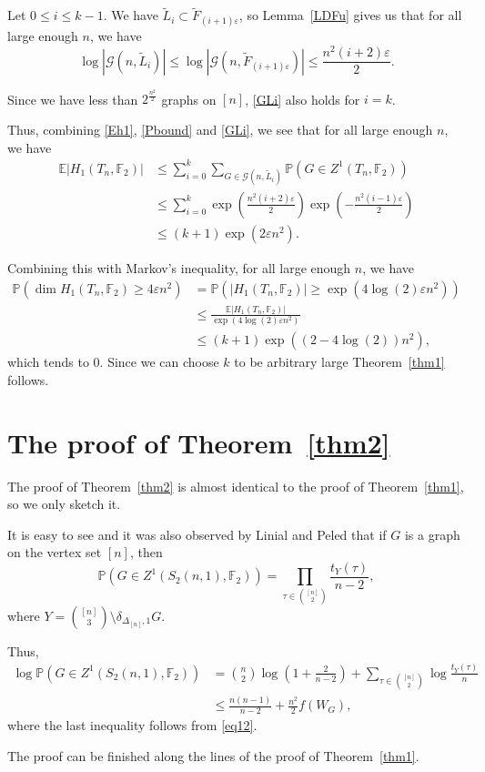 \documentclass[11pt,a4paper]{article}
\theoremstyle{plain}
\theoremstyle{definition}
\begin{document}
Let $0\le i\le k-1$. We have $\widetilde{L}_i\subset \widetilde{F}_{(i+1)\varepsilon}$, so Lemma~\ref{LDFu} gives us that for all large enough $n$, we have
\begin{equation}\label{GLi}\log |\mathcal{G}(n,\widetilde{L}_i)|\le \log |\mathcal{G}(n,\widetilde{F}_{(i+1)\varepsilon})|\le \frac{n^2(i+2)\varepsilon}2.
\end{equation}

Since we have less than $2^{\frac{n^2}2}$ graphs on $[n]$, \eqref{GLi} also holds for $i=k$. 

Thus, combining \eqref{Eh1}, \eqref{Pbound} and \eqref{GLi}, we see that for all large enough $n$, we have
\begin{align*}\mathbb{E} |H_1(T_n,\mathbb{F}_2)|&\le\sum_{i=0}^k \sum_{G\in \mathcal{G}(n,\widetilde{L}_i)}\mathbb{P}\left(G\in Z^1(T_n,\mathbb{F}_2)\right)\\&\le \sum_{i=0}^k \exp\left(\frac{n^2(i+2)\varepsilon}2\right)\exp\left(-\frac{n^2(i-1)\varepsilon}2\right)\\&\le (k+1)\exp\left(2\varepsilon n^2 \right).
\end{align*}

Combining this with Markov's inequality, for all large enough $n$, we have
\begin{align*}\mathbb{P}(\dim H_1(T_n,\mathbb{F}_2)\ge 4\varepsilon n^2)&=\mathbb{P}(| H_1(T_n,\mathbb{F}_2)|\ge \exp(4\log(2)\varepsilon n^2))\\&\le \frac{\mathbb{E} |H_1(T_n,\mathbb{F}_2)|}{\exp(4\log(2)\varepsilon n^2)}\\&\le (k+1)\exp((2-4\log(2))n^2), \end{align*}
which tends to $0$. Since we can choose $k$ to be arbitrary large Theorem~\ref{thm1} follows.

\section{The proof of Theorem~\ref{thm2}}

The proof of Theorem~\ref{thm2} is almost identical to the proof of Theorem~\ref{thm1}, so we only sketch it.

It is easy to see and it was also observed by Linial and Peled \cite[Section 5]{linial2019enumeration} that if $G$ is a graph on the vertex set $[n]$, then
\[\mathbb{P}\left(G\in Z^1(S_2(n,1),\mathbb{F}_2)\right)=\prod_{\tau\in{{[n]}\choose{2}}} \frac{t_Y(\tau)}{n-2},\]
where $Y={{[n]}\choose 3}\setminus\delta_{\Delta_{[n]},1} G$. 

Thus,
\begin{align*}\log \mathbb{P}\left(G\in Z^1(S_2(n,1),\mathbb{F}_2)\right)&={{n}\choose{2}}\log\left(1+\frac{2}{n-2}\right)+\sum_{\tau\in{{[n]}\choose{2}}} \log \frac{t_Y(\tau)}{n}\\&\le \frac{n(n-1)}{n-2}+\frac{n^2}2f(W_G),\end{align*}
where the last inequality follows from \eqref{eq12}.

The proof can be finished along the lines of the proof of Theorem~\ref{thm1}.





\end{document}
